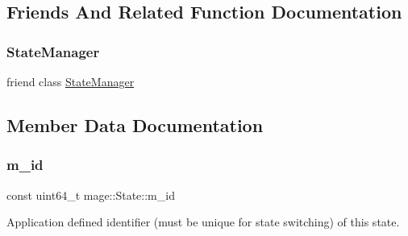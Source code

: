 \subsection{Friends And Related Function Documentation}
\hypertarget{classmage_1_1_state_a8055e77bf0267832ef337718a11fec0d}{}\label{classmage_1_1_state_a8055e77bf0267832ef337718a11fec0d} 
\subsubsection{\texorpdfstring{State\+Manager}{StateManager}}
{\footnotesize\ttfamily friend class \hyperlink{classmage_1_1_state_manager}{State\+Manager}\hspace{0.3cm}{\ttfamily [friend]}}



\subsection{Member Data Documentation}
\hypertarget{classmage_1_1_state_ab135514ec2250e9680b35cfab4e91cab}{}\label{classmage_1_1_state_ab135514ec2250e9680b35cfab4e91cab} 
\subsubsection{\texorpdfstring{m\+\_\+id}{m\_id}}
{\footnotesize\ttfamily const uint64\+\_\+t mage\+::\+State\+::m\+\_\+id\hspace{0.3cm}{\ttfamily [private]}}

Application defined identifier (must be unique for state switching) of this state. 